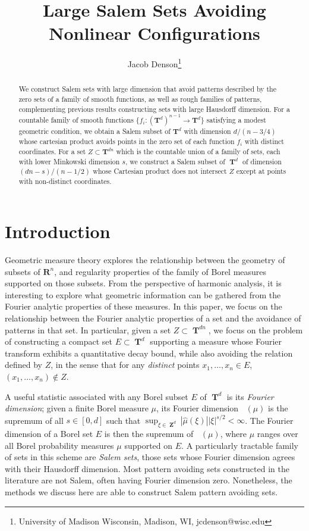 \documentclass[dvipsnames,letterpaper,12pt]{article}
\title{Large Salem Sets Avoiding Nonlinear Configurations}
\author{Jacob Denson\footnote{University of Madison Wisconsin, Madison, WI, jcdenson@wisc.edu}}
\numberwithin{equation}{section}
\DeclareMathOperator{\fordim}{\dim_{\mathbf{F}}}
\DeclareMathOperator{\ZZ}{\mathbf{Z}}
\DeclareMathOperator{\TT}{\mathbf{T}}
\numberwithin{theorem}{section}
\begin{document}
\maketitle

\begin{abstract}
    We construct Salem sets with large dimension that avoid patterns described by the zero sets of a family of smooth functions, as well as rough families of patterns, complementing previous results constructing sets with large Hausdorff dimension. For a countable family of smooth functions $\{ f_i : (\mathbf{T}^d)^{n-1} \to \mathbf{T}^d \}$ satisfying a modest geometric condition, we obtain a Salem subset of $\mathbf{T}^d$ with dimension $d/(n-3/4)$ whose cartesian product avoids points in the zero set of each function $f_i$ with distinct coordinates. For a set $Z \subset \mathbf{T}^{dn}$ which is the countable union of a family of sets, each with lower Minkowski dimension $s$, we construct a Salem subset of $\TT^d$ of dimension $(dn - s)/(n - 1/2)$ whose Cartesian product does not intersect $Z$ except at points with non-distinct coordinates.
\end{abstract}

\section{Introduction}

Geometric measure theory explores the relationship between the geometry of subsets of $\mathbf{R}^n$, and regularity properties of the family of Borel measures supported on those subsets. From the perspective of harmonic analysis, it is interesting to explore what geometric information can be gathered from the Fourier analytic properties of these measures. In this paper, we focus on the relationship between the Fourier analytic properties of a set and the avoidance of patterns in that set. In particular, given a set $Z \subset \TT^{dn}$, we focus on the problem of constructing a compact set $E \subset \TT^d$ supporting a measure whose Fourier transform exhibits a quantitative decay bound, while also avoiding the relation defined by $Z$, in the sense that for any \emph{distinct} points $x_1,\dots,x_n \in E$, $(x_1,\dots,x_n) \not \in Z$.


A useful statistic associated with any Borel subset $E$ of $\TT^d$ is its \emph{Fourier dimension}; given a finite Borel measure $\mu$, its Fourier dimension $\fordim(\mu)$ is the supremum of all $s \in [0,d]$ such that $\sup_{\xi \in \ZZ^d} |\widehat{\mu}(\xi)| |\xi|^{s/2} < \infty$. The Fourier dimension of a Borel set $E$ is then the supremum of $\fordim(\mu)$, where $\mu$ ranges over all Borel probability measures $\mu$ supported on $E$. A particularly tractable family of sets in this scheme are \emph{Salem sets}, those sets whose Fourier dimension agrees with their Hausdorff dimension. Most pattern avoiding sets constructed in the literature are not Salem, often having Fourier dimension zero. Nonetheless, the methods we discuss here are able to construct Salem pattern avoiding sets.
\end{document}
